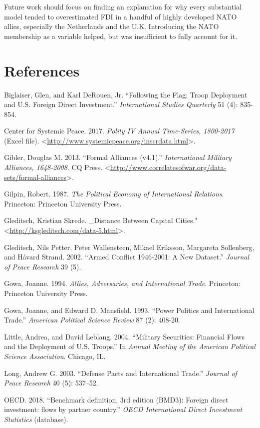 \documentclass[11pt,]{article}
\begin{document}
Future work should focus on finding an explanation for why every
substantial model tended to overestimated FDI in a handful of highly
developed NATO allies, especially the Netherlands and the U.K.
Introducing the NATO membership as a variable helped, but was
insufficient to fully account for it.

\hypertarget{references}{%
\section{References}\label{references}}

Biglaiser, Glen, and Karl DeRouen, Jr. ``Following the Flag: Troop
Deployment and U.S. Foreign Direct Investment.'' \emph{International
Studies Quarterly} 51 (4): 835-854.

Center for Systemic Peace. 2017. \emph{Polity IV Annual Time-Series,
1800-2017} (Excel file).
\textless{}\url{http://www.systemicpeace.org/inscrdata.html}\textgreater{}.

Gibler, Douglas M. 2013. ``Formal Alliances (v4.1).''
\emph{International Military Alliances, 1648-2008}. CQ Press.
\textless{}\url{http://www.correlatesofwar.org/data-sets/formal-alliances}\textgreater{}.

Gilpin, Robert. 1987. \emph{The Political Economy of International
Relations}. Princeton: Princeton University Press.

Gleditsch, Kristian Skrede. \_Distance Between Capital Cities."
\textless{}\url{http://ksgleditsch.com/data-5.html}\textgreater{}.

Gleditsch, Nils Petter, Peter Wallensteen, Mikael Eriksson, Margareta
Sollenberg, and Håvard Strand. 2002. ``Armed Conflict 1946-2001: A New
Dataset.'' \emph{Journal of Peace Research} 39 (5).

Gowa, Joanne. 1994. \emph{Allies, Adversaries, and International Trade}.
Princeton: Princeton University Press.

Gowa, Joanne, and Edward D. Mansfield. 1993. ``Power Politics and
International Trade.'' \emph{American Political Science Review} 87 (2):
408-20.

Little, Andrea, and David Leblang. 2004. ``Military Securities:
Financial Flows and the Deployment of U.S. Troops.'' In \emph{Annual
Meeting of the American Political Science Association}. Chicago, IL.

Long, Andrew G. 2003. ``Defense Pacts and International Trade.''
\emph{Journal of Peace Research} 40 (5): 537--52.

OECD. 2018. ``Benchmark definition, 3rd edition (BMD3): Foreign direct
investment: flows by partner country.'' \emph{OECD International Direct
Investment Statistics} (database).
\end{document}
